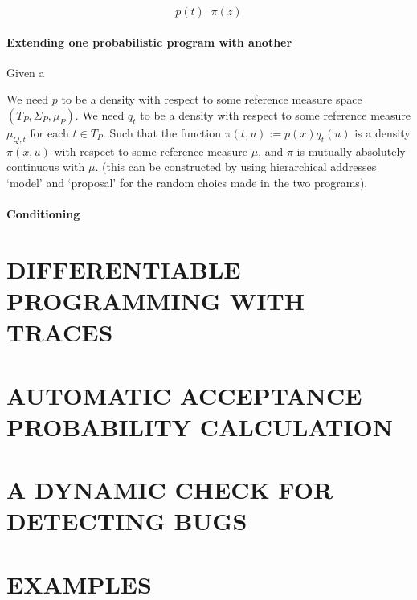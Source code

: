 \documentclass[twoside]{article}
\begin{document}
\[
p(t) \;\; \pi(z)
\]

\paragraph{Extending one probabilistic program with another}
Given a 


We need $p$ to be a density with respect to some reference measure space $(T_P, \Sigma_{P}, \mu_P)$.
We need $q_t$ to be a density with respect to some reference measure $\mu_{Q,t}$ for each $t \in T_P$.
Such that the function $\pi(t, u) := p(x) q_t(u)$ is a density $\pi(x, u)$ with respect to some reference measure $\mu$, and $\pi$ is mutually absolutely continuous with $\mu$.
(this can be constructed by using hierarchical addresses `model' and `proposal' for the random choics made in the two programs).

\paragraph{Conditioning}

\section{DIFFERENTIABLE PROGRAMMING WITH TRACES}


\section{AUTOMATIC ACCEPTANCE PROBABILITY CALCULATION}




\section{A DYNAMIC CHECK FOR DETECTING BUGS}


\section{EXAMPLES}
\end{document}
